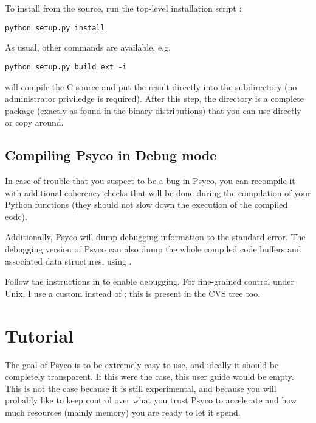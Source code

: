 \documentclass{manual}
\begin{document}
To install from the source, run the top-level installation script :

\begin{verbatim}
python setup.py install
\end{verbatim}

As usual, other commands are available, e.g.\ 

\begin{verbatim}
python setup.py build_ext -i
\end{verbatim}

will compile the C source and put the result directly into the  subdirectory (no administrator priviledge is required). After this step, the  directory is a complete package (exactly as found in the binary distributions) that you can use directly or copy around.


\section{Compiling Psyco in Debug mode}\label{debugpsyco}

In case of trouble that you suspect to be a bug in Psyco, you can recompile it with additional coherency checks that will be done during the compilation of your Python functions (they should not slow down the execution of the compiled code).

Additionally, Psyco will dump debugging information to the standard error.  The debugging version of Psyco can also dump the whole compiled code buffers and associated data structures, using .

Follow the instructions in  to enable debugging.  For fine-grained control under Unix, I use a custom  instead of ; this  is present in the CVS tree too.



\chapter{Tutorial}

The goal of Psyco is to be extremely easy to use, and ideally it should be completely transparent.  If this were the case, this user guide would be empty.  This is not the case because it is still experimental, and because you will probably like to keep control over what you trust Psyco to accelerate and how much resources (mainly memory) you are ready to let it spend.
\end{document}
